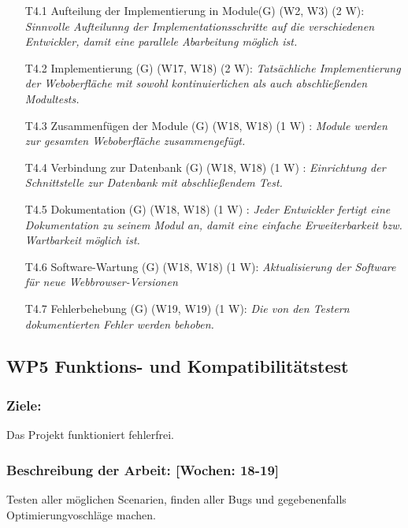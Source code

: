 \documentclass{scrreprt}
\begin{document}
\begin{enumerate}
\item [T4.1] Aufteilung der Implementierung in Module(G) (W2, W3) (2 W): \emph{ Sinnvolle Aufteilunng der Implementationsschritte auf die verschiedenen Entwickler, damit eine parallele Abarbeitung möglich ist.}
\item [T4.2] Implementierung (G) (W17, W18) (2 W): \emph{ Tatsächliche Implementierung der Weboberfläche mit sowohl kontinuierlichen als auch abschließenden Modultests.}
\item [T4.3] Zusammenfügen der Module (G) (W18, W18) (1 W) : \emph{ Module werden zur gesamten Weboberfläche zusammengefügt.}
\item [T4.4] Verbindung zur Datenbank (G) (W18, W18) (1 W) : \emph{ Einrichtung der Schnittstelle zur Datenbank mit abschließendem Test.}
\item [T4.5] Dokumentation (G) (W18, W18) (1 W) : \emph{ Jeder Entwickler fertigt eine Dokumentation zu seinem Modul an, damit eine einfache Erweiterbarkeit bzw. Wartbarkeit möglich ist.}
\item [T4.6] Software-Wartung (G) (W18, W18) (1 W): \emph{ Aktualisierung der Software für neue Webbrowser-Versionen}
\item [T4.7] Fehlerbehebung (G) (W19, W19) (1 W): \emph{Die von den Testern dokumentierten Fehler werden behoben.}

\end{enumerate}

\subsection*{WP5 Funktions- und Kompatibilitätstest}

\subsubsection{Ziele:} Das Projekt funktioniert fehlerfrei.
\subsubsection{Beschreibung der Arbeit: [Wochen: 18-19]} Testen aller möglichen Scenarien, finden aller Bugs und gegebenenfalls Optimierungvoschläge machen.
\end{document}
